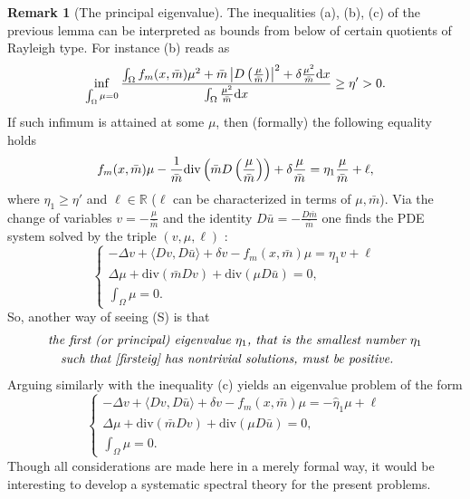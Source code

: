 \documentclass[10pt,a4paper,nouppercase,nowrite]{article}
\numberwithin{equation}{section}
\newcommand{\di}{{\rm d}}
\newcommand{\Sp}{{\textsc (S)} }
\newcommand{\R}{\mathbb{R}}
\theoremstyle{definition}
\newtheorem{rmk}[defn]{Remark}
\begin{document}
\begin{rmk}[The principal eigenvalue]\label{firsteigrmk} The inequalities (a), (b), (c) of the previous lemma can be interpreted as bounds from below of certain quotients of Rayleigh type. For instance (b) reads as
\[
\inf_{\int_\Omega \mu = 0}\frac{\int_{\Omega} f_m(x,\bar{m}) \mu^2 + \bar{m} \left| D\left( \frac{\mu}{\bar{m}} \right) \right|^2 + \delta \frac{\mu^2}{\bar{m}} \di x}{\int_{\Omega} \frac{\mu^2}{\bar{m}} \di x} \geq \eta' > 0.
\]
If such infimum is attained at some $\mu$, then (formally) the following equality holds
\begin{equation}\label{raylinear}
f_m(x,\bar{m}) \mu - \frac1{\bar m}{\rm div}\left( \bar{m} D\left( \frac{\mu}{\bar{m}} \right) \right) + \delta \frac{\mu}{\bar{m}} = \eta_1 \frac{\mu}{\bar{m}} + \ell,
\end{equation}
where $\eta_1\ge \eta'$ and $\ell \in \R$ ($\ell$ can be characterized in terms of $\mu, \bar m$). Via the change of variables $v = -\frac \mu {\bar m}$ and the identity $D \bar u = - \frac{D \bar m}{\bar m}$ one finds the PDE system solved by the triple $(v, \mu, \ell)$ :
\begin{equation}\label{firsteig}
\begin{cases}
	- \Delta v + \langle Dv,D\bar{u} \rangle + \delta v - f_m(x,\bar{m})\mu = \eta_1 v + \ell \\
	\Delta \mu + \text{div}(\bar{m}Dv) + \text{div}(\mu D\bar{u}) = 0, \\ \int_\Omega \mu = 0.
\end{cases}
\end{equation}
So, another way of seeing \Sp is that 
\begin{align*}
&\textit{the first (or principal) eigenvalue $\eta_1$, that is the smallest number $\eta_1$} \\ & \quad \textit{such that \eqref{firsteig} has nontrivial solutions, must be positive.}
\end{align*}
Arguing similarly with the inequality (c) yields an eigenvalue problem of the form
\[
\begin{cases}
	- \Delta v + \langle Dv,D\bar{u} \rangle + \delta v - f_m(x,\bar{m})\mu = -\hat \eta_1 \mu + \ell \\
	\Delta \mu + \text{div}(\bar{m}Dv) + \text{div}(\mu D\bar{u}) = 0, \\ \int_\Omega \mu = 0.
\end{cases}
\]
Though all considerations are made here in a merely formal way, it would be interesting to develop a systematic spectral theory for the present problems.
\end{rmk}
\end{document}
